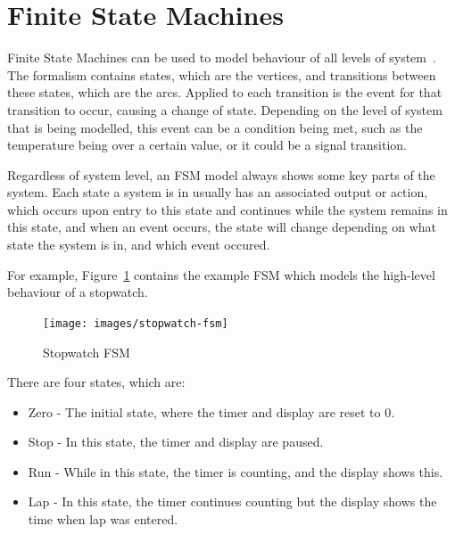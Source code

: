 \newpage
\section {Finite State Machines \label {sec:fsms}}

Finite State Machines can be used to model behaviour of all levels of system~\cite{Taraate2016}. 
The formalism contains states, which are the vertices, and transitions between these states, which 
are the arcs. Applied to each transition is the event for that transition to occur, causing a change 
of state. Depending on the level of system that is being modelled, this event can be a condition being met,
such as the temperature being over a certain value, or it could be a signal transition. 

Regardless of system level, an FSM model always shows some key parts of the system. Each state a system is 
in usually has an associated output or action, which occurs upon entry to this state and continues while the system remains
in this state, and when an event occurs, the state will change depending on what state the system is in, and which event occured. 

For example, Figure~\ref{fig:stopwatch} contains the example FSM which models the 
high-level behaviour of a stopwatch.

\begin{figure}[h]
\begin{centering}
\texttt{[image: images/stopwatch-fsm]}
\par\end{centering}
\protect\caption{\label{fig:stopwatch} Stopwatch FSM}
\end{figure}

\noindent There are four states, which are:

\begin{itemize}

\item Zero - The initial state, where the timer and display are reset to 0. 

\item Stop - In this state, the timer and display are paused.

\item Run - While in this state, the timer is counting, and the display shows this.

\item Lap - In this state, the timer continues counting but the display shows the time when lap was entered.

\end{itemize}

